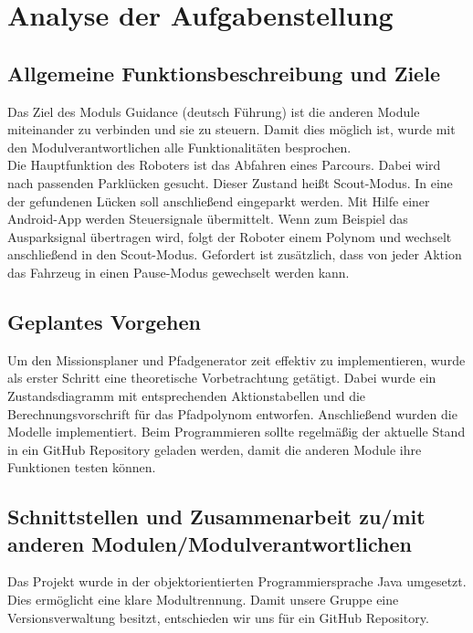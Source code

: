 \chapter{Analyse der Aufgabenstellung}


\section{Allgemeine Funktionsbeschreibung und Ziele}

Das Ziel des Moduls Guidance (deutsch Führung) ist die anderen Module miteinander zu verbinden und sie zu steuern. 
Damit dies möglich ist, wurde mit den Modulverantwortlichen alle Funktionalitäten besprochen. \\

\noindent Die Hauptfunktion des Roboters ist das Abfahren eines Parcours. Dabei wird nach passenden Parklücken gesucht. Dieser Zustand heißt Scout-Modus.
In eine der gefundenen Lücken soll anschließend eingeparkt werden. Mit Hilfe einer Android-App werden Steuersignale übermittelt. Wenn zum Beispiel das Ausparksignal übertragen wird, folgt der Roboter einem Polynom und wechselt anschließend in den Scout-Modus. Gefordert ist zusätzlich, dass von jeder Aktion das Fahrzeug in einen Pause-Modus gewechselt werden kann.

\section{Geplantes Vorgehen}

Um den Missionsplaner und Pfadgenerator zeit effektiv zu implementieren, wurde als erster Schritt eine theoretische Vorbetrachtung getätigt. Dabei wurde ein Zustandsdiagramm mit entsprechenden Aktionstabellen und die Berechnungsvorschrift für das Pfadpolynom entworfen. Anschließend wurden die Modelle implementiert. Beim Programmieren sollte regelmäßig der aktuelle Stand in ein \glqq GitHub Repository\grqq{} geladen werden, damit die anderen Module ihre Funktionen testen können.

\section{Schnittstellen und Zusammenarbeit zu/mit anderen Modulen/Modulverantwortlichen}

Das Projekt wurde in der objektorientierten Programmiersprache Java umgesetzt. Dies ermöglicht eine klare Modultrennung. Damit unsere Gruppe eine Versionsverwaltung besitzt, entschieden wir uns für ein \glqq GitHub Repository\grqq{}.\\


